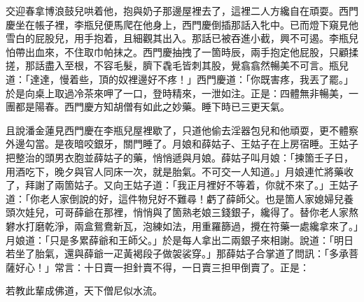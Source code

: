 交迎春拿博浪鼓兒哄着他，抱與奶子那邊屋裡去了，這裡二人方纔自在頑耍。西門慶坐在帳子裡，李瓶兒便馬爬在他身上，西門慶倒插那話入牝中。已而燈下窺見他雪白的屁股兒，用手抱着，且細觀其出入。那話已被吞進小截，興不可遏。李瓶兒怕帶出血來，{}不住取巾帕抹之。西門慶抽拽了一箇時辰，兩手抱定他屁股，只顧揉搓，那話盡入至根，不容毛髮，臍下毳毛皆刺其股，覺翕翕然暢美不可言。瓶兒道：「達達，慢着些，頂的奴裡邊好不疼！」西門慶道：「你既害疼，我丟了罷。」於是向桌上取過冷茶來呷了一口，登時精來，一泄如注。正是：四體無非暢美，一團都是陽春。西門慶方知胡僧有如此之妙藥。睡下時已三更天氣。

且說潘金蓮見西門慶在李瓶兒屋裡歇了，只道他偷去淫器包兒和他頑耍，更不體察外邊勾當。是夜暗咬銀牙，關門睡了。月娘和薛姑子、王姑子在上房宿睡。王姑子把整治的頭男衣胞並薛姑子的藥，悄悄遞與月娘。薛姑子叫月娘：「揀箇壬子日，用酒吃下，晚夕與官人同床一次，就是胎氣。不可交一人知道。」月娘連忙將藥收了，拜謝了兩箇姑子。又向王姑子道：「我正月裡好不等着，你就不來了。」王姑子道：「你老人家倒說的好，這件物兒好不難尋！虧了薛師父。也是箇人家媳婦兒養頭次娃兒，可哥薛爺在那裡，悄悄與了箇熟老娘三錢銀子，纔得了。{}替你老人家熬礬水打磨乾淨，兩盒鴛鴦新瓦，泡練如法，用重羅篩過，攪在符藥一處纔拿來了。」月娘道：「只是多累薛爺和王師父。」於是每人拿出二兩銀子來相謝。說道：「明日若坐了胎氣，還與薛爺一疋黃褐段子做袈裟穿。」那薛姑子合掌道了問訊：「多承菩薩好心！」常言：十日賣一担針賣不得，一日賣三担甲倒賣了。正是：

\begin{myquote} 
若教此輩成佛道，天下僧尼似水流。
\end{myquote} 

